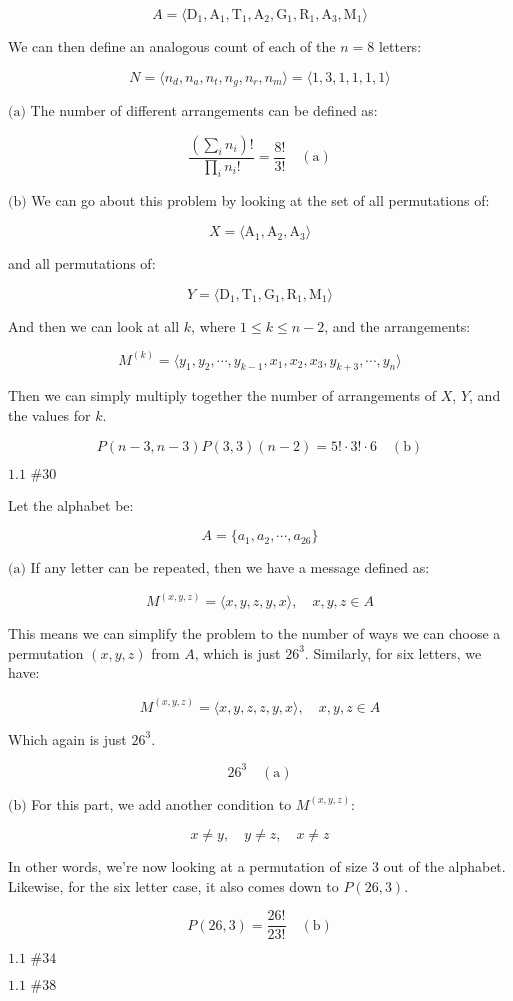\documentclass{article}
\newcommand{\problem}[2]{$\boxed{\text{#1 \##2}}$}
\newcommand{\subproblem}[1]{$\boxed{\text{(#1)}}$}
\newcommand{\subsolution}[2]{\boxed{#2\quad(\text{#1})}}
\begin{document}
\begin{multicols*}{2}
\[
A=\langle
\text{D}_1,
\text{A}_1,
\text{T}_1,
\text{A}_2,
\text{G}_1,
\text{R}_1,
\text{A}_3,
\text{M}_1
\rangle
\]

We can then define an analogous count of each of the $n=8$ letters:

\[
N=\langle n_d,n_a,n_t,n_g,n_r,n_m\rangle=\langle 1,3,1,1,1,1\rangle
\]

%
\subproblem{a} The number of different arrangements can be defined as:

\[
\subsolution{a}{\dfrac{\left(\sum\limits_i n_i\right)!}{\prod\limits_i n_i!}=\dfrac{8!}{3!}}
\]

%
\subproblem{b} We can go about this problem by looking at the set of
all permutations of:

\[
X=\langle{}\text{A}_1,\text{A}_2,\text{A}_3\rangle
\]

and all permutations of:

\[
Y=\langle \text{D}_1,\text{T}_1,\text{G}_1,\text{R}_1,\text{M}_1\rangle
\]

And then we can look at all $k$, where $1\le{}k\le{}n-2$, and the
arrangements:

\[
M^{(k)}=\langle y_1,y_2,\cdots,y_{k-1},x_1,x_2,x_3,y_{k+3},\cdots,y_n\rangle
\]

Then we can simply multiply together the number of arrangements of
$X$, $Y$, and the values for $k$.

\[
\subsolution{b}{P(n-3,n-3)P(3,3)(n-2)=5!\cdot3!\cdot6}
\]

%
\problem{1.1}{30}

Let the alphabet be:

\[
A=\{a_1,a_2,\cdots,a_{26}\}
\]

%
\subproblem{a} If any letter can be repeated, then we have a message
defined as:

\[
M^{(x,y,z)}=\langle x,y,z,y,x \rangle,\quad x,y,z\in A
\]

This means we can simplify the problem to the number of ways we can
choose a permutation $(x,y,z)$ from $A$, which is just
$26^3$. Similarly, for six letters, we have:

\[
M^{(x,y,z)}=\langle x,y,z,z,y,x \rangle,\quad x,y,z\in A
\]

Which again is just $26^3$.

\[
\subsolution{a}{26^3}
\]

%
\subproblem{b} For this part, we add another condition to
$M^{(x,y,z)}$:

\[
x\ne y,\quad y\ne z,\quad x\ne z
\]

In other words, we're now looking at a permutation of size 3 out of
the alphabet. Likewise, for the six letter case, it also comes down to
$P(26,3)$.

\[
\subsolution{b}{P(26,3)=\frac{26!}{23!}}
\]

%
\problem{1.1}{34}



%
\problem{1.1}{38}




\end{multicols*}
\end{document}
